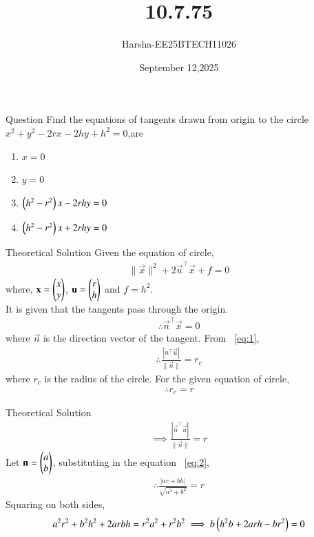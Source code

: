 \documentclass{beamer}
\title %
{10.7.75}
\date{September 12,2025}
\author %
{Harsha-EE25BTECH11026}
\begin{document}
\frame{\titlepage}


\begin{frame}{Question}
Find the equations of tangents drawn from origin to the circle $x^2+y^2-2rx-2hy+h^2=0$,are
\begin{enumerate}
    \item $x=0$
    \item $y=0$
    \item $\left(h^2-r^2\right)x-2rhy=0$
    \item $\left(h^2-r^2\right)x+2rhy=0$
\end{enumerate}
\end{frame}

\begin{frame}{Theoretical Solution}
Given the equation of circle,
\begin{align}
    \|\vec{x}\|^2+2\vec{u}^{\top}\vec{x}+f=0 \label{eq:1}
\end{align}
where, $\mathbf{x}=\begin{pmatrix}x\\y\end{pmatrix}$, $\mathbf{u}=\begin{pmatrix}r\\h\end{pmatrix}$ and $f=h^2$.\\ 
It is given that the tangents pass through the origin.
\begin{align}
    \therefore \vec{n}^{\top}\vec{x}=0
\end{align}
where $\vec{n}$ is the direction vector of the tangent.
From ~\eqref{eq:1},
\begin{align}
    \therefore \frac{|n^{\top}\vec{u}|}{\|\vec{n}\|}=r_c
\end{align}
where $r_c$ is the radius of the circle. For the given equation of circle,
\begin{align}
    \therefore r_c=r
\end{align}
\end{frame}

\begin{frame}{Theoretical Solution}
\begin{align}
    \implies \frac{|\vec{n}^{\top}\vec{u}|}{\|\vec{n}\|}=r \label{eq:2}
\end{align}
Let $\mathbf{n}=\begin{pmatrix}a\\b\end{pmatrix}$, substituting in the equation ~\eqref{eq:2},
\begin{align}
    \therefore \frac{|ar+bh|}{\sqrt{a^2+b^2}}=r
\end{align}
Squaring on both sides,
\begin{align}
    a^2r^2+b^2h^2+2arbh=r^2a^2+r^2b^2 \implies b\left(h^2b+2arh-br^2\right)=0
    \label{eq:3}
\end{align}
\end{frame}
\end{document}
